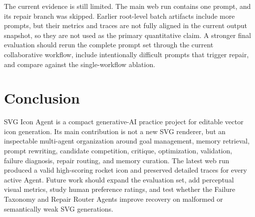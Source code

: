 \documentclass[10pt]{article}
\newcommand{\systemname}{SVG Icon Agent}
\begin{document}
The current evidence is still limited. The main web run contains one prompt, and its repair branch was skipped. Earlier root-level batch artifacts include more prompts, but their metrics and traces are not fully aligned in the current output snapshot, so they are not used as the primary quantitative claim. A stronger final evaluation should rerun the complete prompt set through the current collaborative workflow, include intentionally difficult prompts that trigger repair, and compare against the single-workflow ablation.

\section{Conclusion}

\systemname{} is a compact generative-AI practice project for editable vector icon generation. Its main contribution is not a new SVG renderer, but an inspectable multi-agent organization around goal management, memory retrieval, prompt rewriting, candidate competition, critique, optimization, validation, failure diagnosis, repair routing, and memory curation. The latest web run produced a valid high-scoring rocket icon and preserved detailed traces for every active Agent. Future work should expand the evaluation set, add perceptual visual metrics, study human preference ratings, and test whether the Failure Taxonomy and Repair Router Agents improve recovery on malformed or semantically weak SVG generations.



\end{document}
